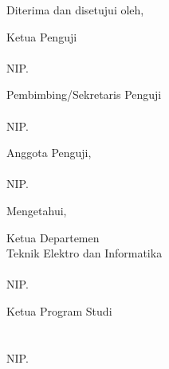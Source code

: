 \begin{center}
    Diterima dan disetujui oleh,
\end{center}
  \begin{minipage}{0.45\textwidth}
    Ketua Penguji\\[2cm]\underline{\ketuapenguji}\\
    NIP. \NIPketuapenguji
\end{minipage}
\hfill
\begin{minipage}{0.45\textwidth}
    Pembimbing/Sekretaris Penguji\\[2cm]
    \underline{\pembimbing}\\
    NIP. \NIPpembimbing
\end{minipage}%
\begin{center}
    \centering
    \begin{minipage}{0.45\textwidth}
    Anggota Penguji,\\[2cm]
    \underline{\anggotapenguji}\\
    NIP. \NIPanggotapenguji
\end{minipage}%
\end{center}
\begin{center}
    Mengetahui,
\end{center}
\begin{minipage}{0.5\textwidth}
    Ketua Departemen\\
    Teknik Elektro dan Informatika\\[2.5cm]
    \underline{\koordepartemen}\\
    NIP. \NIPkadep
\end{minipage}
\hfill
\begin{minipage}{0.45\textwidth}
    Ketua Program Studi\\
    \prodi\\[2.5cm]
    \underline{\koorprodi}\\
    NIP. \NIPKaprodi
\end{minipage}%